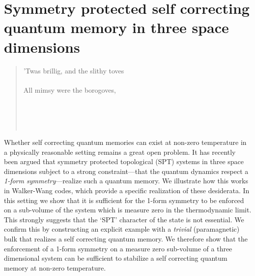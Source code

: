 
\chapter{Symmetry protected self correcting quantum memory in three space dimensions} \label{chp:WalkerWang}

\vspace{-.35in}
\begin{quotation}
\begin{multicols}{2}
	\noindent 'Twas brillig, and the slithy toves \\
	 \\
	\noindent All mimsy were the borogoves, \\
	 

\raggedleft 
	\\
	\\
	\\
\end{multicols}

\end{quotation}
	
Whether self correcting quantum memories can exist at non-zero temperature in a physically reasonable setting remains a great open problem. It has recently been argued \cite{RobertsBartlett2020} that symmetry protected topological (SPT) systems in three space dimensions subject to a strong constraint---that the quantum dynamics respect a {\it 1-form symmetry}---realize such a quantum memory. We illustrate how this works in Walker-Wang codes, which provide a specific realization of these desiderata. In this setting we show that it is sufficient for the 1-form symmetry to be enforced on a sub-volume of the system which is measure zero in the thermodynamic limit. This strongly suggests that the `SPT' character of the state is not essential. We confirm this by constructing an explicit example with a {\it trivial} (paramagnetic) bulk that realizes a self correcting quantum memory. We therefore show that the enforcement of a 1-form symmetry on a measure zero sub-volume of a three dimensional system can be sufficient to stabilize a self correcting quantum memory at non-zero temperature. 

